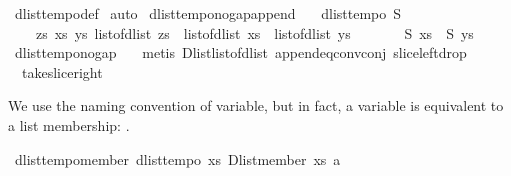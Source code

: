 \begin{isabellebody}
%
\isadelimproof
%
\endisadelimproof
%
\isatagproof
{}\isamarkupfalse%
\ dlist{\isacharunderscore}tempo{}{\isacharunderscore}def\isanewline
{}\isamarkupfalse%
\ auto%
\endisatagproof
{\isafoldproof}%
%
\isadelimproof
\isanewline
%
\endisadelimproof
\isanewline
{}\isamarkupfalse%
\ dlist{\isacharunderscore}tempo{\isacharunderscore}{}{\isacharunderscore}no{\isacharunderscore}gap{\isacharunderscore}append{\isacharcolon}\ \isanewline
\ \ {\isachardoublequoteopen}dlist{\isacharunderscore}tempo{}\ S\ {\isasymLongrightarrow}\ \isanewline
\ \ \ \ {\isasymforall}zs\ xs\ ys{\isachardot}\ list{\isacharunderscore}of{\isacharunderscore}dlist\ zs\ {\isacharequal}\ list{\isacharunderscore}of{\isacharunderscore}dlist\ xs\ {\isacharat}\ list{\isacharunderscore}of{\isacharunderscore}dlist\ ys\ {\isasymlongrightarrow}\ \isanewline
\ \ \ \ {\isasymnot}\ {\isacharparenleft}{\isacharparenleft}S\ xs\ {\isasymand}\ S\ ys{\isacharparenright}{\isacharparenright}{\isachardoublequoteclose}\isanewline
%
\isadelimproof
%
\endisadelimproof
%
\isatagproof
{}\isamarkupfalse%
\ dlist{\isacharunderscore}tempo{\isacharunderscore}{}{\isacharunderscore}no{\isacharunderscore}gap\ \ \isanewline
{}\isamarkupfalse%
\ {\isacharparenleft}metis\ Dlist{\isacharunderscore}list{\isacharunderscore}of{\isacharunderscore}dlist\ append{\isacharunderscore}eq{\isacharunderscore}conv{\isacharunderscore}conj\ slice{\isacharunderscore}left{\isacharunderscore}drop\ \isanewline
\ \ take{\isacharunderscore}slice{\isacharunderscore}right{\isacharparenright}%
\endisatagproof
{\isafoldproof}%
%
\isadelimproof
%
\endisadelimproof
%
\isamarkuptrue%
%
\begin{isamarkuptext}%
We use the naming convention of variable, but in fact, a variable is equivalent to a list membership: 
.%
\end{isamarkuptext}\isamarkuptrue%
\isamarkupfalse%
\ dlist{\isacharunderscore}tempo{}{\isacharunderscore}member{\isacharcolon}\ {\isachardoublequoteopen}dlist{\isacharunderscore}tempo{}\ {\isacharparenleft}{\isasymlambda}xs{\isachardot}\ Dlist{\isachardot}member\ xs\ a{\isacharparenright}{\isachardoublequoteclose}\isanewline
%
\isadelimproof
%
\endisadelimproof
%
\isatagproof
{}\isamarkupfalse%

\end{isabellebody}
